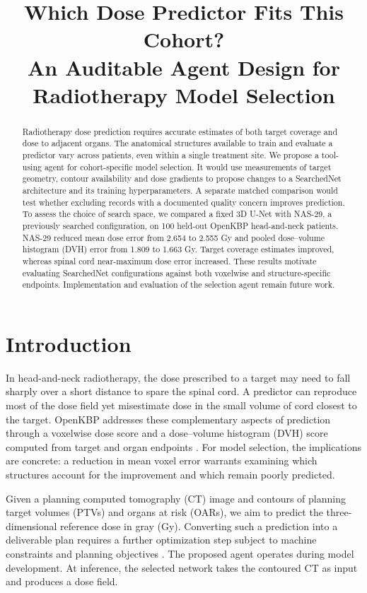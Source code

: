 \documentclass[letterpaper]{article}
\title{Which Dose Predictor Fits This Cohort?\\An Auditable Agent Design for Radiotherapy Model Selection}
\author{}
\begin{document}
\maketitle

\begin{abstract}
Radiotherapy dose prediction requires accurate estimates of both target coverage and dose to adjacent organs. The anatomical structures available to train and evaluate a predictor vary across patients, even within a single treatment site. We propose a tool-using agent for cohort-specific model selection. It would use measurements of target geometry, contour availability and dose gradients to propose changes to a SearchedNet architecture and its training hyperparameters. A separate matched comparison would test whether excluding records with a documented quality concern improves prediction. To assess the choice of search space, we compared a fixed 3D U-Net with NAS-29, a previously searched configuration, on 100 held-out OpenKBP head-and-neck patients. NAS-29 reduced mean dose error from 2.654 to 2.555 Gy and pooled dose--volume histogram (DVH) error from 1.809 to 1.663 Gy. Target coverage estimates improved, whereas spinal cord near-maximum dose error increased. These results motivate evaluating SearchedNet configurations against both voxelwise and structure-specific endpoints. Implementation and evaluation of the selection agent remain future work.
\end{abstract}

\section{Introduction}
In head-and-neck radiotherapy, the dose prescribed to a target may need to fall sharply over a short distance to spare the spinal cord. A predictor can reproduce most of the dose field yet misestimate dose in the small volume of cord closest to the target. OpenKBP addresses these complementary aspects of prediction through a voxelwise dose score and a dose--volume histogram (DVH) score computed from target and organ endpoints \citep{openkbp}. For model selection, the implications are concrete: a reduction in mean voxel error warrants examining which structures account for the improvement and which remain poorly predicted.

Given a planning computed tomography (CT) image and contours of planning target volumes (PTVs) and organs at risk (OARs), we aim to predict the three-dimensional reference dose in gray (Gy). Converting such a prediction into a deliverable plan requires a further optimization step subject to machine constraints and planning objectives \citep{planning}. The proposed agent operates during model development. At inference, the selected network takes the contoured CT as input and produces a dose field.
\end{document}
